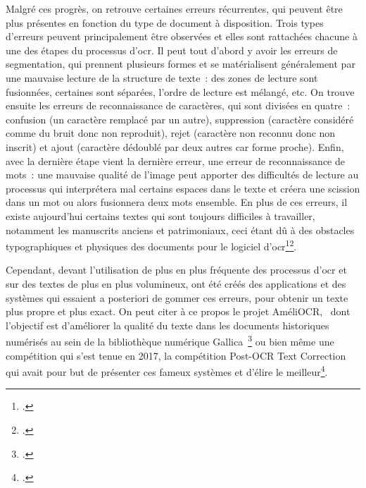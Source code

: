 Malgré ces progrès, on retrouve certaines erreurs récurrentes, qui peuvent être plus présentes en fonction du type de document à disposition. Trois types d'erreurs peuvent principalement être observées et elles sont rattachées chacune à une des étapes du processus d'\acrshort{ocr}. Il peut tout d'abord y avoir les erreurs de segmentation, qui prennent plusieurs formes et se matérialisent généralement par une mauvaise lecture de la structure de texte~: des zones de lecture sont fusionnées, certaines sont séparées, l'ordre de lecture est mélangé, etc. On trouve ensuite les erreurs de reconnaissance de caractères, qui sont divisées en quatre~: confusion (un caractère remplacé par un autre), suppression (caractère considéré comme du bruit donc non reproduit), rejet (caractère non reconnu donc non inscrit) et ajout (caractère dédoublé par deux autres car forme proche). Enfin, avec la dernière étape vient la dernière erreur, une erreur de reconnaissance de mots~: une mauvaise qualité de l'image peut apporter des difficultés de lecture au processus qui interprétera mal certains espaces dans le texte et créera une scission dans un mot ou alors fusionnera deux mots ensemble. En plus de ces erreurs, il existe aujourd'hui certains textes qui sont toujours difficiles à travailler, notamment les manuscrits anciens et patrimoniaux, ceci étant dû à des obstacles typographiques et physiques des documents pour le logiciel d'\acrshort{ocr}\footcite{bensalah_mass_digitization}\footcite{belaid_numerisation}.

Cependant, devant l'utilisation de plus en plus fréquente des processus d'\acrshort{ocr} et sur des textes de plus en plus volumineux, ont été créés des applications et des systèmes qui essaient a posteriori de gommer ces erreurs, pour obtenir un texte plus propre et plus exact. On peut citer à ce propos le projet AméliOCR, \og~dont l'objectif est d'améliorer la qualité du texte dans les documents historiques numérisés au sein de la bibliothèque numérique Gallica~\footcite{chiron_erreurs_ocr}\fg{} ou bien même une compétition qui s'est tenue en 2017, la compétition Post-OCR Text Correction qui avait pour but de présenter ces fameux systèmes et d'élire le meilleur\footcite{magallon_erreurs_ocr}.

